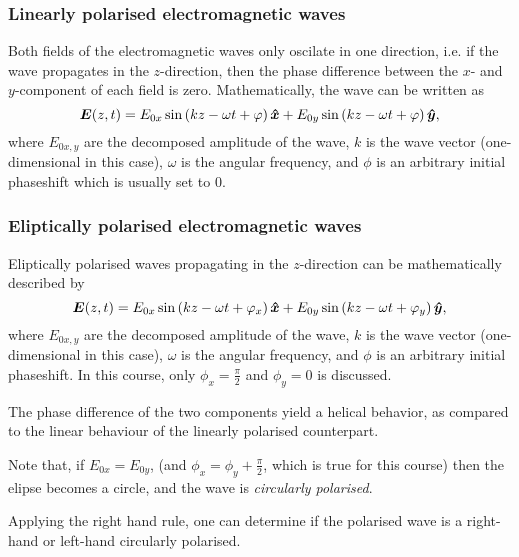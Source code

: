     \subsubsection*{Linearly polarised electromagnetic waves}
        Both fields of the electromagnetic waves only oscilate in one direction,
        i.e. if the wave propagates in the $z$-direction, 
        then the phase difference between the $x$- and $y$-component of each field is zero.
        Mathematically, the wave can be written as
        \begin{equation}
            \E(z, t) = E_{0x}\sin\left(kz - \omega t + \phi\right)\hat{x} +
            E_{0y}\sin\left(kz - \omega t + \phi\right)\hat{y},
        \end{equation}
        where $E_{0x,y}$ are the decomposed amplitude of the wave, 
        $k$ is the wave vector (one-dimensional in this case), 
        $\omega$ is the angular frequency, 
        and $\phi$ is an arbitrary initial phaseshift which is usually set to 0.

    \subsubsection*{Eliptically polarised electromagnetic waves}
        Eliptically polarised waves propagating in the $z$-direction can be mathematically described by
        \begin{equation}
            \E(z, t) = E_{0x}\sin\left(kz - \omega t + \phi_x \right)\hat{x} +
            E_{0y}\sin\left(kz - \omega t + \phi_y \right)\hat{y},
        \end{equation}
        where $E_{0x,y}$ are the decomposed amplitude of the wave, 
        $k$ is the wave vector (one-dimensional in this case), 
        $\omega$ is the angular frequency, 
        and $\phi$ is an arbitrary initial phaseshift. 
        In this course, only $\phi_x = \frac{\pi}{2}$ and $\phi_y = 0$ is discussed.
        
        The phase difference of the two components yield a helical behavior, 
        as compared to the linear behaviour of the linearly polarised counterpart.

        Note that, if $E_{0x} = E_{0y}$, (and $\phi_x = \phi_y + \frac{\pi}{2}$, which is true for this course)
        then the elipse becomes a circle, and the wave is \textit{circularly polarised}.

        Applying the right hand rule, 
        one can determine if the polarised wave is a right-hand or left-hand circularly polarised.

